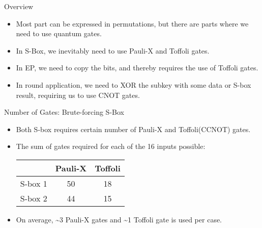 \documentclass{beamer}
\begin{document}
	\begin{frame}{Overview}
		\begin{itemize}
			\item Most part can be expressed in permutations, but there are parts where we need to use quantum gates.
			\item In S-Box, we inevitably need to use Pauli-X and Toffoli gates.
			\item In EP, we need to copy the bits, and thereby requires the use of Toffoli gates.
			\item In round application, we need to XOR the subkey with some data or S-box result, requiring us to use CNOT gates.
		\end{itemize}
	\end{frame}
	
	\begin{frame}{Number of Gates: Brute-forcing S-Box}
		\begin{itemize}
			\item Both S-box requires certain number of Pauli-X and Toffoli(CCNOT) gates.
			\item The sum of gates required for each of the 16 inputs possible:
			\begin{center}
				\begin{tabular}{c|c|c}
					        & Pauli-X & Toffoli \\\hline
					S-box 1 & 50      & 18      \\\hline
					S-box 2 & 44      & 15
				\end{tabular}
			\end{center}
			\item On average, \textasciitilde3 Pauli-X gates and \textasciitilde1 Toffoli gate is used per case.
		\end{itemize}
	\end{frame}
	
\end{document}
